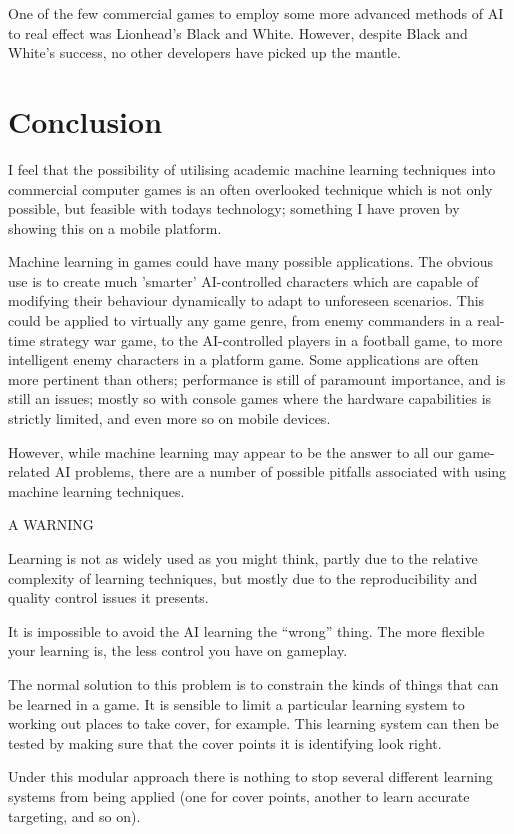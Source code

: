\documentclass[a4paper,oneside]{report}
\begin{document}
One of the few commercial games to employ some more advanced methods of AI to real effect was Lionhead's Black and White. However, despite Black and White's success, no other developers have picked up the mantle.

\section{Conclusion}

I feel that the possibility of utilising academic machine learning techniques into commercial computer games is an often overlooked technique which is not only possible, but feasible with todays technology; something I have proven by showing this on a mobile platform. 

Machine learning in games could have many possible applications. The obvious use is to create much 'smarter' AI-controlled characters which are capable of modifying their behaviour dynamically to adapt to unforeseen scenarios. This could be applied to virtually any game genre, from enemy commanders in a real-time strategy war game, to the AI-controlled players in a football game, to more intelligent enemy characters in a platform game. Some applications are often more pertinent than others; performance is still of paramount importance, and is still an issues; mostly so with console games where the hardware capabilities is strictly limited, and even more so on mobile devices.
	
However, while machine learning may appear to be the answer to all our game-related AI problems, there are a number of possible pitfalls associated with using machine learning techniques.

A WARNING

Learning is not as widely used as you might think, partly due to the relative complexity of learning techniques, but mostly due to the reproducibility and quality control issues it presents.

It is impossible to avoid the AI learning the “wrong” thing. The more flexible your learning is, the less control you have on gameplay.

The normal solution to this problem is to constrain the kinds of things that can be learned in a game. It is sensible to limit a particular learning system to working out places to take cover, for example. This learning system can then be tested by making sure that the cover points it is identifying look right.

Under this modular approach there is nothing to stop several different learning systems from being applied (one for cover points, another to learn accurate targeting, and so on).
\end{document}

